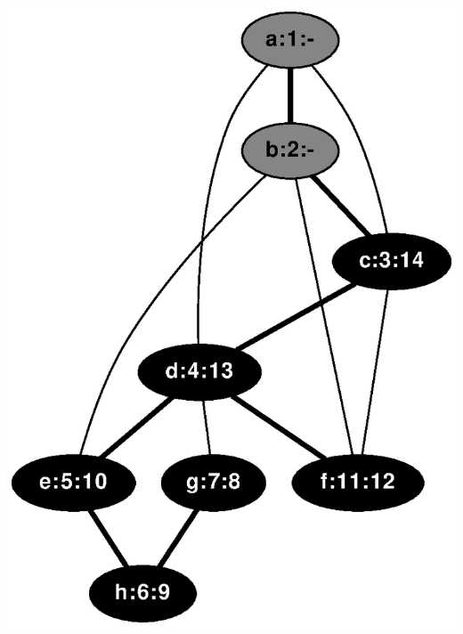 \documentclass{article}
\begin{document}
\includegraphics[height=.3\textheight]{dfs_undirected_classroom_14.eps}
\vspace{1em}
\end{document}
